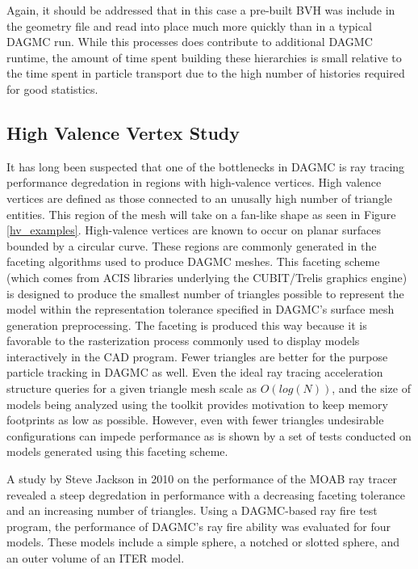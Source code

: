 \documentclass[12pt, a4paper]{article}
\begin{document}
Again, it should be addressed that in this case a pre-built BVH was include in the geometry file and read into place much more quickly than in a typical DAGMC run. While this processes does contribute to additional DAGMC runtime, the amount of time spent building these hierarchies is small relative to the time spent in particle transport due to the high number of histories required for good statistics.


\subsection{High Valence Vertex Study}%
\label{hv_study}

It has long been suspected that one of the bottlenecks in DAGMC is ray tracing performance degredation in regions with high-valence vertices. High valence vertices are defined as those connected to an unusally high number of triangle entities. This region of the mesh will take on a fan-like shape as seen in Figure \ref{hv_examples}. High-valence vertices are known to occur on planar surfaces bounded by a circular curve. These regions are commonly generated in the faceting algorithms used to produce DAGMC meshes. This faceting scheme (which comes from ACIS libraries underlying the CUBIT/Trelis graphics engine) is designed to produce the smallest number of triangles possible to represent the model within the representation tolerance specified in DAGMC's surface mesh generation preprocessing. The faceting is produced this way because it is favorable to the rasterization process commonly used to display models interactively in the CAD program. Fewer triangles are better for the purpose particle tracking in DAGMC as well. Even the ideal ray tracing acceleration structure queries for a given triangle mesh scale as $O(log(N))$, and the size of models being analyzed using the toolkit provides motivation to keep memory footprints as low as possible. However, even with fewer triangles undesirable configurations can impede performance as is shown by a set of tests conducted on models generated using this faceting scheme.

A study by Steve Jackson in 2010 on the performance of the MOAB ray tracer revealed a steep degredation in performance with a decreasing faceting tolerance and an increasing number of triangles. Using a DAGMC-based ray fire test program, the performance of DAGMC's ray fire ability was evaluated for four models. These models include a simple sphere, a notched or slotted sphere, and an outer volume of an ITER model.
\end{document}
